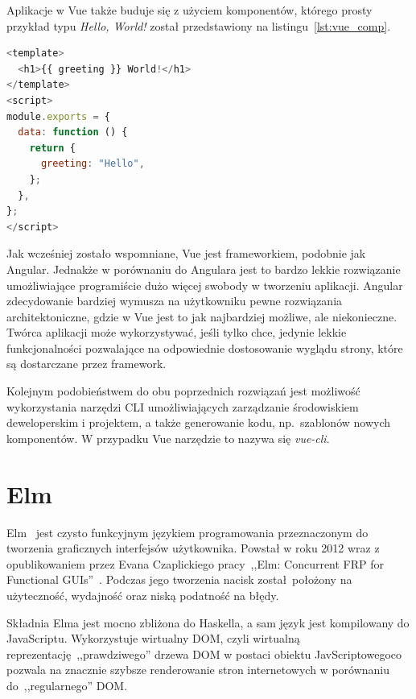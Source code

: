 \documentclass[twoside,a4paper]{report}
\begin{document}
Aplikacje w Vue także buduje się z użyciem komponentów, którego prosty przykład typu \textit{Hello, World!} został przedstawiony na listingu~\ref{lst:vue_comp}.

\begin{lstlisting}[caption={Komponent w Vue},label={lst:vue_comp},language=JavaScript]
<template>
  <h1>{{ greeting }} World!</h1>
</template>
<script>
module.exports = {
  data: function () {
    return {
      greeting: "Hello",
    };
  },
};
</script>
\end{lstlisting}

Jak wcześniej zostało wspomniane, Vue jest frameworkiem, podobnie jak Angular.
Jednakże w porównaniu do Angulara jest to bardzo lekkie rozwiązanie umożliwiające programiście dużo więcej swobody w tworzeniu aplikacji.
Angular zdecydowanie bardziej wymusza na użytkowniku pewne rozwiązania architektoniczne, gdzie w Vue jest to jak najbardziej możliwe, ale niekonieczne.
Twórca aplikacji może wykorzystywać, jeśli tylko chce, jedynie lekkie funkcjonalności pozwalające na odpowiednie dostosowanie wyglądu strony, które są dostarczane przez framework.

Kolejnym podobieństwem do obu poprzednich rozwiązań jest możliwość wykorzystania narzędzi CLI umożliwiających zarządzanie środowiskiem deweloperskim i projektem, a także generowanie kodu, np.~szablonów nowych komponentów.
W przypadku Vue narzędzie to nazywa się \textit{vue-cli}.


\chapter{Elm}
Elm~\cite{elmdocs} jest czysto funkcyjnym językiem programowania przeznaczonym do tworzenia graficznych interfejsów użytkownika.
Powstał w roku 2012 wraz z opublikowaniem przez Evana Czaplickiego pracy~,,Elm: Concurrent FRP for Functional GUIs''~\cite{Czaplicki2012ElmC}.
Podczas jego tworzenia nacisk został położony na użyteczność, wydajność oraz niską podatność na błędy.

Składnia Elma jest mocno zbliżona do Haskella, a sam język jest kompilowany do JavaScriptu.
Wykorzystuje wirtualny DOM, czyli wirtualną reprezentację~,,prawdziwego'' drzewa DOM w postaci obiektu JavScriptowegoco pozwala na znacznie szybsze renderowanie stron internetowych w porównaniu do~,,regularnego'' DOM\@.
\end{document}
